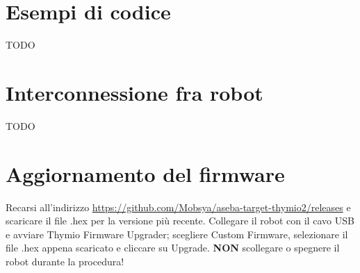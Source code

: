 \documentclass[12pt]{article}
\begin{document}
		
\section{Esempi di codice}
		
	TODO
	
	
\section{Interconnessione fra robot}\label{network}

	TODO
	
		
\section{Aggiornamento del firmware}

	Recarsi all'indirizzo \url{https://github.com/Mobsya/aseba-target-thymio2/releases} e scaricare il file .hex per la versione più recente. Collegare il robot con il cavo USB e avviare Thymio Firmware Upgrader; scegliere Custom Firmware, selezionare il file .hex appena scaricato e cliccare su Upgrade. \textbf{NON} scollegare o spegnere il robot durante la procedura!
	
\end{document}

